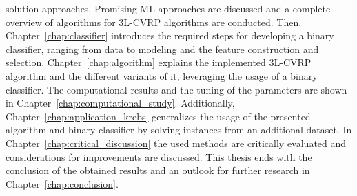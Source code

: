 solution approaches. Promising \gls{ML} approaches are discussed and a complete overview of algorithms
for \gls{3L-CVRP} algorithms are conducted. Then, Chapter~\ref{chap:classifier} introduces the required
steps for developing a binary classifier, ranging from data to modeling and the feature construction and selection.
Chapter~\ref{chap:algorithm} explains the implemented \gls{3L-CVRP} algorithm and
the different variants of it, leveraging the usage of a binary classifier. The computational results and the
tuning of the parameters are shown in Chapter~\ref{chap:computational_study}. Additionally, Chapter~\ref{chap:application_krebs}
generalizes the usage of the presented algorithm and binary classifier by solving instances from an additional dataset.
In Chapter~\ref{chap:critical_discussion} the used methods are critically evaluated and considerations for improvements
are discussed. This thesis ends with the conclusion
of the obtained results and an outlook for further research in Chapter~\ref{chap:conclusion}.
